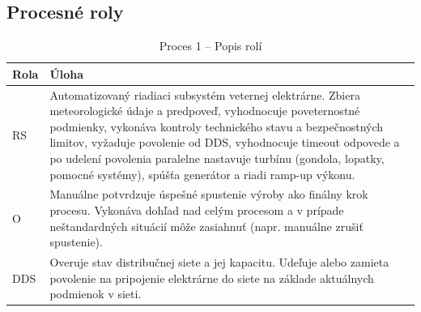 \documentclass[12pt,a4paper]{article}
\begin{document}
\subsection{Procesné roly}
\begin{table}[H]
  \centering
  \renewcommand{\arraystretch}{1.2}
  \begin{tabularx}{\textwidth}{|p{}|X|}
    \hline
    \textbf{Rola} & \textbf{Úloha} \\
    \hline
    RS & Automatizovaný riadiaci subsystém veternej elektrárne. Zbiera meteorologické údaje a predpoveď, vyhodnocuje poveternostné podmienky, vykonáva kontroly technického stavu a bezpečnostných limitov, vyžaduje povolenie od DDS, vyhodnocuje timeout odpovede a po udelení povolenia paralelne nastavuje turbínu (gondola, lopatky, pomocné systémy), spúšťa generátor a riadi ramp-up výkonu. \\
    \hline
    O & Manuálne potvrdzuje úspešné spustenie výroby ako finálny krok procesu. Vykonáva dohľad nad celým procesom a v prípade neštandardných situácií môže zasiahnuť (napr. manuálne zrušiť spustenie). \\
    \hline
    DDS & Overuje stav distribučnej siete a jej kapacitu. Udeľuje alebo zamieta povolenie na pripojenie elektrárne do siete na základe aktuálnych podmienok v sieti. \\
    \hline
  \end{tabularx}
  \caption{Proces 1 -- Popis rolí}
\end{table}



\end{document}
